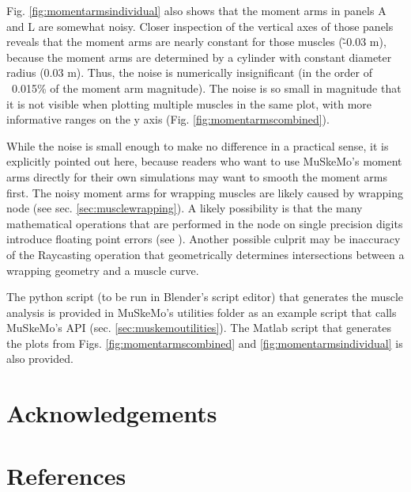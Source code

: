 \documentclass{article}
\begin{document}
Fig. \ref{fig:momentarmsindividual} also shows that the moment arms in panels A and L are somewhat noisy. Closer inspection of the vertical axes of those panels reveals that the moment arms are nearly constant for those muscles (\~ -0.03 \si{m}), because the moment arms are determined by a cylinder with constant diameter radius (0.03 \si{m}). Thus, the noise is numerically insignificant (in the order of ~0.015\% of the moment arm magnitude). The noise is so small in magnitude that it is not visible when plotting multiple muscles in the same plot, with more informative ranges on the y axis (Fig. \ref{fig:momentarmscombined}).

While the noise is small enough to make no difference in a practical sense, it is explicitly pointed out here, because readers who want to use MuSkeMo's moment arms directly for their own simulations may want to smooth the moment arms first. The noisy moment arms for wrapping muscles are likely caused by wrapping node (see sec. \ref{sec:musclewrapping}). A likely possibility is that the many mathematical operations that are performed in the node on single precision digits introduce floating point errors (see ). Another possible culprit may be inaccuracy of the Raycasting operation that geometrically determines intersections between a wrapping geometry and a muscle curve.

The python script (to be run in Blender's script editor) that generates the muscle analysis is provided in MuSkeMo's utilities folder as an example script that calls MuSkeMo's API (sec. \ref{sec:muskemoutilities}). The Matlab script that generates the plots from Figs. \ref{fig:momentarmscombined} and \ref{fig:momentarmsindividual} is also provided.

\newpage
\section{Acknowledgements}

\section*{References}
\printbibliography[heading=none] %
\end{document}
